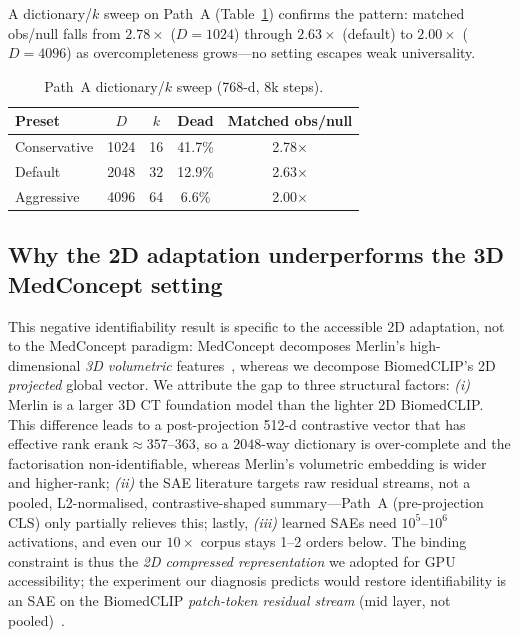 \documentclass[sigconf, nonacm]{acmart}
\begin{document}
A dictionary/$k$ sweep on Path~A (Table~\ref{tab:ablation}) confirms the pattern: matched obs/null falls from $2.78{\times}$ ($D{=}1024$) through $2.63{\times}$ (default) to $2.00{\times}$ ($D{=}4096$) as overcompleteness grows---no setting escapes weak universality.

\begin{table}[t]
\caption{Path~A dictionary/$k$ sweep (768-d, 8k steps).}
\label{tab:ablation}
\small
\begin{tabular}{lcccc}
\toprule
Preset & $D$ & $k$ & Dead & Matched obs/null \\
\midrule
Conservative & 1024 & 16 & 41.7\% & 2.78$\times$ \\
Default & 2048 & 32 & 12.9\% & 2.63$\times$ \\
Aggressive & 4096 & 64 & 6.6\% & 2.00$\times$ \\
\bottomrule
\end{tabular}
\end{table}

\subsection{Why the 2D adaptation underperforms the 3D MedConcept setting}
\label{sec:hypotheses}
This negative identifiability result is specific to the accessible 2D adaptation, not to the MedConcept paradigm: MedConcept decomposes Merlin's high-dimensional \emph{3D volumetric} features~\cite{blankemeier2024merlin}, whereas we decompose BiomedCLIP's 2D \emph{projected} global vector. We attribute the gap to three structural factors: \emph{(i)} Merlin is a larger 3D CT foundation model than the lighter 2D BiomedCLIP. This difference leads to a post-projection 512-d contrastive vector that has effective rank $\mathrm{erank}{\approx}357$--$363$, so a $2048$-way dictionary is over-complete and the factorisation non-identifiable, whereas Merlin's volumetric embedding is wider and higher-rank; \emph{(ii)} the SAE literature targets raw residual streams, not a pooled, L2-normalised, contrastive-shaped summary---Path~A (pre-projection CLS) only partially relieves this; lastly, \emph{(iii)} learned SAEs need $10^5$--$10^6$ activations, and even our $10{\times}$ corpus stays 1--2 orders below. The binding constraint is thus the \emph{2D compressed representation} we adopted for GPU accessibility; the experiment our diagnosis predicts would restore identifiability is an SAE on the BiomedCLIP \emph{patch-token residual stream} (mid layer, not pooled)~\cite{bricken2023monosemanticity}.
\end{document}
